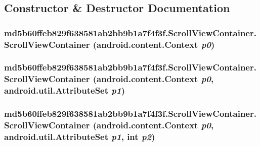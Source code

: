\subsection{Constructor \& Destructor Documentation}
\hypertarget{classmd5b60ffeb829f638581ab2bb9b1a7f4f3f_1_1_scroll_view_container_4da9edc9a3c476f7f6f113c21e94f2c3}{
\subsubsection[{ScrollViewContainer}]{\setlength{\rightskip}{0pt plus 5cm}md5b60ffeb829f638581ab2bb9b1a7f4f3f.ScrollViewContainer.ScrollViewContainer (android.content.Context {\em p0})}}
\label{classmd5b60ffeb829f638581ab2bb9b1a7f4f3f_1_1_scroll_view_container_4da9edc9a3c476f7f6f113c21e94f2c3}


\hypertarget{classmd5b60ffeb829f638581ab2bb9b1a7f4f3f_1_1_scroll_view_container_9988f00f43908c747f96baaaaf9b6220}{
\subsubsection[{ScrollViewContainer}]{\setlength{\rightskip}{0pt plus 5cm}md5b60ffeb829f638581ab2bb9b1a7f4f3f.ScrollViewContainer.ScrollViewContainer (android.content.Context {\em p0}, \/  android.util.AttributeSet {\em p1})}}
\label{classmd5b60ffeb829f638581ab2bb9b1a7f4f3f_1_1_scroll_view_container_9988f00f43908c747f96baaaaf9b6220}


\hypertarget{classmd5b60ffeb829f638581ab2bb9b1a7f4f3f_1_1_scroll_view_container_3daf03644acbaebadff91f69061c392e}{
\subsubsection[{ScrollViewContainer}]{\setlength{\rightskip}{0pt plus 5cm}md5b60ffeb829f638581ab2bb9b1a7f4f3f.ScrollViewContainer.ScrollViewContainer (android.content.Context {\em p0}, \/  android.util.AttributeSet {\em p1}, \/  int {\em p2})}}
\label{classmd5b60ffeb829f638581ab2bb9b1a7f4f3f_1_1_scroll_view_container_3daf03644acbaebadff91f69061c392e}


